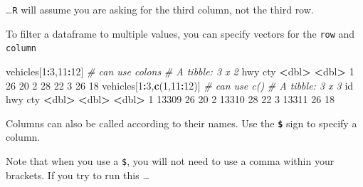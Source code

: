 \documentclass[
]{book}
\newenvironment{Shaded}{\begin{snugshade}}{\end{snugshade}}
\newcommand{\CommentTok}[1]{\textcolor[rgb]{0.56,0.35,0.01}{\textit{#1}}}
\newcommand{\DecValTok}[1]{\textcolor[rgb]{0.00,0.00,0.81}{#1}}
\newcommand{\ErrorTok}[1]{\textcolor[rgb]{0.64,0.00,0.00}{\textbf{#1}}}
\newcommand{\KeywordTok}[1]{\textcolor[rgb]{0.13,0.29,0.53}{\textbf{#1}}}
\newcommand{\NormalTok}[1]{#1}
\newcommand{\OperatorTok}[1]{\textcolor[rgb]{0.81,0.36,0.00}{\textbf{#1}}}
\newcommand{\StringTok}[1]{\textcolor[rgb]{0.31,0.60,0.02}{#1}}
\begin{document}
\ldots{}\texttt{R} will assume you are asking for the third column, not the third row.

To filter a dataframe to multiple values, you can specify vectors for the \texttt{row} and \texttt{column}

\begin{Shaded}
\begin{Highlighting}[]
\NormalTok{vehicles[}\DecValTok{1}\OperatorTok{:}\DecValTok{3}\NormalTok{,}\DecValTok{11}\OperatorTok{:}\DecValTok{12}\NormalTok{] }\CommentTok{# can use colons}
\CommentTok{# A tibble: 3 x 2}
\NormalTok{    hwy   cty}
  \OperatorTok{<}\NormalTok{dbl}\OperatorTok{>}\StringTok{ }\ErrorTok{<}\NormalTok{dbl}\OperatorTok{>}
\DecValTok{1}    \DecValTok{26}    \DecValTok{20}
\DecValTok{2}    \DecValTok{28}    \DecValTok{22}
\DecValTok{3}    \DecValTok{26}    \DecValTok{18}
\NormalTok{vehicles[}\DecValTok{1}\OperatorTok{:}\DecValTok{3}\NormalTok{,}\KeywordTok{c}\NormalTok{(}\DecValTok{1}\NormalTok{,}\DecValTok{11}\OperatorTok{:}\DecValTok{12}\NormalTok{)]  }\CommentTok{# can use c()}
\CommentTok{# A tibble: 3 x 3}
\NormalTok{     id   hwy   cty}
  \OperatorTok{<}\NormalTok{dbl}\OperatorTok{>}\StringTok{ }\ErrorTok{<}\NormalTok{dbl}\OperatorTok{>}\StringTok{ }\ErrorTok{<}\NormalTok{dbl}\OperatorTok{>}
\DecValTok{1} \DecValTok{13309}    \DecValTok{26}    \DecValTok{20}
\DecValTok{2} \DecValTok{13310}    \DecValTok{28}    \DecValTok{22}
\DecValTok{3} \DecValTok{13311}    \DecValTok{26}    \DecValTok{18}
\end{Highlighting}
\end{Shaded}

Columns can also be called according to their names. Use the \textbf{\texttt{\$}} sign to specify a column.

\begin{Shaded}
\end{Shaded}

Note that when you use a \texttt{\$}, you will not need to use a comma within your brackets. If you try to run this \ldots{}

\begin{Shaded}
\end{Shaded}
\end{document}
